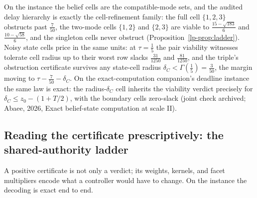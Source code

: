 \documentclass[10pt,twocolumn]{article}
\theoremstyle{plain}
\theoremstyle{definition}
\theoremstyle{remark}
\begin{document}
On the instance the belief cells are the compatible-mode sets, and the
audited delay hierarchy is exactly the cell-refinement family: the full
cell \(\{1,2,3\}\) obstructs past \(\tfrac7{50}\), the two-mode cells
\(\{1,2\}\) and \(\{2,3\}\) are viable to
\(\tfrac{15 - \sqrt{183}}{6}\) and \(\tfrac{10 - \sqrt{58}}{6}\),
and the singleton cells never obstruct (Proposition~\ref{lp-prop:ladder}).
Noisy state cells price in the same units: at \(\tau = \tfrac15\) the
pair viability witnesses tolerate cell radius up to their worst row slacks
\(\tfrac{31}{1250}\) and \(\tfrac{81}{1250}\), and the triple's
obstruction certificate survives any state-cell radius \(\delta_C <
\Gamma(\tfrac15) = \tfrac3{50}\), the margin moving to
\(\tau - \tfrac7{50} - \delta_C\). On the exact-computation companion's
deadline instance the same law is exact: the radius-\(\delta_C\) cell
inherits the viability verdict precisely for
\(\delta_C \le z_0 - (1 + T/2)\), with the boundary cells zero-slack
(joint check archived; Abaee, 2026, Exact belief-state computation at scale II).

\subsection{Reading the certificate prescriptively: the shared-authority ladder}\label{lp-ladder}

A positive certificate is not only a verdict; its weights, kernels, and
facet multipliers encode what a controller would have to change. On the
instance the decoding is exact end to end.
\end{document}
